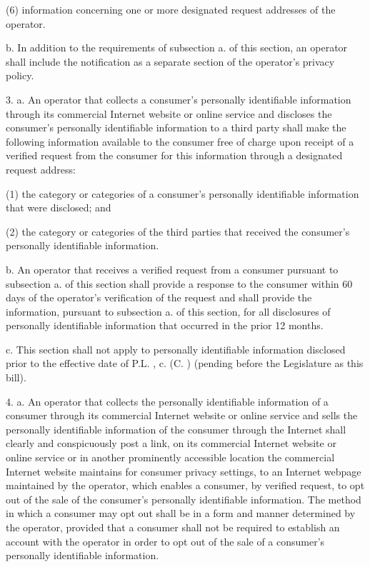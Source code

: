      (6)   information concerning one or more designated request addresses of the operator.

      b.   In addition to the requirements of subsection a. of this section, an operator shall include the notification as a separate section of the operator's privacy policy.

 

     3.    a.   An operator that collects a consumer's personally identifiable information through its commercial Internet website or online service and discloses the consumer's personally identifiable information to a third party shall make the following information available to the consumer free of charge upon receipt of a verified request from the consumer for this information through a designated request address:

     (1)   the category or categories of a consumer's personally identifiable information that were disclosed; and

     (2)   the category or categories of the third parties that received the consumer's personally identifiable information.

      b.   An operator that receives a verified request from a consumer pursuant to subsection a. of this section shall provide a response to the consumer within 60 days of the operator's verification of the request and shall provide the information, pursuant to subsection a. of this section, for all disclosures of personally identifiable information that occurred in the prior 12 months.

      c.    This section shall not apply to personally identifiable information disclosed prior to the effective date of P.L.    , c.    (C.        ) (pending before the Legislature as this bill).

 

     4.    a.   An operator that collects the personally identifiable information of a consumer through its commercial Internet website or online service and sells the personally identifiable information of the consumer through the Internet shall clearly and conspicuously post a link, on its commercial Internet website or online service or in another prominently accessible location the commercial Internet website maintains for consumer privacy settings, to an Internet webpage maintained by the operator, which enables a consumer, by verified request, to opt out of the sale of the consumer's personally identifiable information. The method in which a consumer may opt out shall be in a form and manner determined by the operator, provided that a consumer shall not be required to establish an account with the operator in order to opt out of the sale of a consumer's personally identifiable information.

